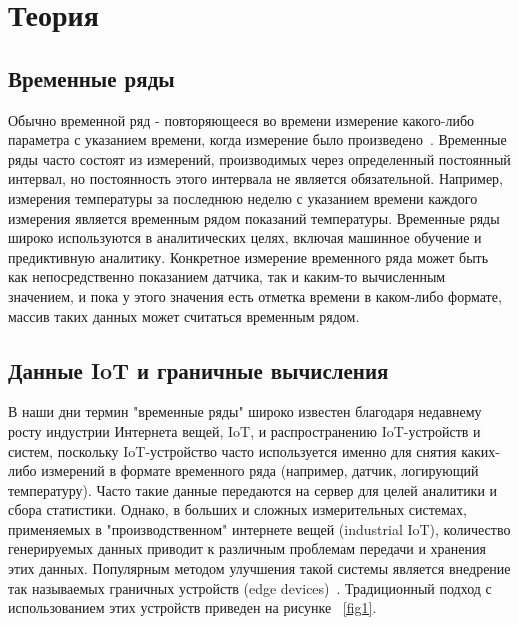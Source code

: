 \section{Теория}
\subsection{Временные ряды}
Обычно временной ряд - повторяющееся во времени измерение какого-либо параметра с указанием времени, когда измерение было произведено~\cite{time_series_databases}. Временные ряды часто состоят из измерений, производимых через определенный постоянный интервал, но постоянность этого интервала не является обязательной. Например, измерения температуры за последнюю неделю с указанием времени каждого измерения является временным рядом показаний температуры. Временные ряды широко используются в аналитических целях, включая машинное обучение и предиктивную аналитику. Конкретное измерение временного ряда может быть как непосредственно показанием датчика, так и каким-то вычисленным значением, и пока у этого значения есть отметка времени в каком-либо формате, массив таких данных может считаться временным рядом.

\subsection{Данные IoT и граничные вычисления}

В наши дни термин "временные ряды" широко известен благодаря недавнему росту индустрии Интернета вещей, IoT, и распространению IoT-устройств и систем, поскольку IoT-устройство часто используется именно для снятия каких-либо измерений в формате временного ряда (например, датчик, логирующий температуру). Часто такие данные передаются на сервер для целей аналитики и сбора статистики. Однако, в больших и сложных измерительных системах, применяемых в "производственном" интернете вещей (industrial IoT), количество генерируемых данных приводит к различным проблемам передачи и хранения этих данных. Популярным методом улучшения такой системы является внедрение так называемых граничных устройств (edge devices)~\cite{ind_iot_edge}. Традиционный подход с использованием этих устройств приведен на рисунке ~\ref{fig1}.

